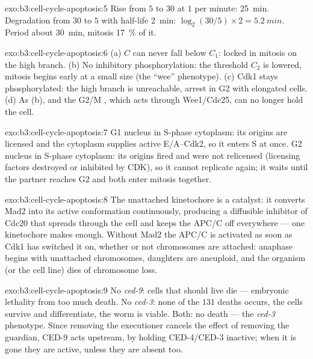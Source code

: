 \begin{solution}{exo:b3:cell-cycle-apoptosis:5}
Rise from $5$ to $30$ at $1$ per minute: \qty{25}{min}. Degradation from
$30$ to $5$ with half-life \qty{2}{min}: $\log_{2}(30/5)\times 2 =
\qty{5.2}{min}$. Period about \qty{30}{min}, mitosis \qty{17}{\%} of it.
\end{solution}

\begin{solution}{exo:b3:cell-cycle-apoptosis:6}
(a) $C$ can never fall below $C_{1}$: locked in mitosis on the high
branch. (b) No inhibitory phosphorylation: the threshold $C_{2}$ is
lowered, mitosis begins early at a small size (the ``wee'' phenotype).
(c) Cdk1 stays phosphorylated: the high branch is unreachable, arrest in
G2 with elongated cells. (d) As (b), and the G2/M , which acts
through Wee1/Cdc25, can no longer hold the cell.
\end{solution}

\begin{solution}{exo:b3:cell-cycle-apoptosis:7}
G1 nucleus in S-phase cytoplasm: its origins are licensed and the
cytoplasm supplies active  E/A--Cdk2, so it enters S at once. G2
nucleus in S-phase cytoplasm: its origins fired and were not
relicensed (licensing factors destroyed or inhibited by CDK), so it
cannot replicate again; it waits until the partner reaches G2 and both
enter mitosis together.
\end{solution}

\begin{solution}{exo:b3:cell-cycle-apoptosis:8}
The unattached kinetochore is a catalyst: it converts Mad2 into its
active conformation continuously, producing a diffusible inhibitor of
Cdc20 that spreads through the cell and keeps the APC/C off everywhere
--- one kinetochore makes enough. Without Mad2 the APC/C is activated
as soon as Cdk1 has switched it on, whether or not chromosomes are
attached: anaphase begins with unattached chromosomes, daughters are
aneuploid, and the organism (or the cell line) dies of chromosome loss.
\end{solution}

\begin{solution}{exo:b3:cell-cycle-apoptosis:9}
No \emph{ced-9}: cells that should live die --- embryonic lethality
from too much death. No \emph{ced-3}: none of the $131$ deaths occurs,
the cells survive and differentiate, the worm is viable. Both: no death
--- the \emph{ced-3} phenotype. Since removing the executioner cancels
the effect of removing the guardian, CED-9 acts upstream, by holding
CED-4/CED-3 inactive; when it is gone they are active, unless they are
absent too.
\end{solution}

